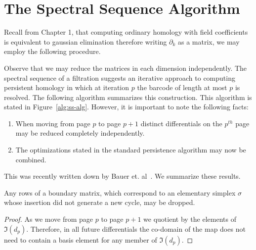 \section{The Spectral Sequence Algorithm}
\label{sec:persistence-algorithm}
Recall from Chapter 1, that computing ordinary homology with field coefficients is equivalent to gaussian elimination therefore writing $\partial_k$ as a matrix, we may employ the following procedure.

Observe that we may reduce the matrices in each dimension independently.
The spectral sequence of a filtration suggests an iterative approach to computing persistent homology in which at iteration $p$ the barcode of length at most $p$ is resolved. The following algorithm summarizes this construction.
This algorithm is stated in Figure~\ref{alg:ss-alg}. However, it is important to note the following facts:
\begin{enumerate}
\item When moving from page $p$ to page $p+1$ distinct differentials on the $p^{th}$ page may be reduced completely independently. 
\item The optimizations stated in the standard persistence algorithm may now be combined.
\end{enumerate}
This was recently written down by Bauer et. al~\cite{bkr-cccph-13}. We summarize these results.
\begin{theorem}
Any rows of a boundary matrix, which correspond to an elementary simplex $\sigma$ whose insertion did not generate a new cycle, may be dropped.
\end{theorem}
\begin{proof}
As we move from page $p$ to page $p+1$ we quotient by the elements of $\Im(d_p)$. Therefore, in all future differentials the co-domain of the map does not need to contain a basis element for any member of $\Im(d_p)$.
\end{proof}
